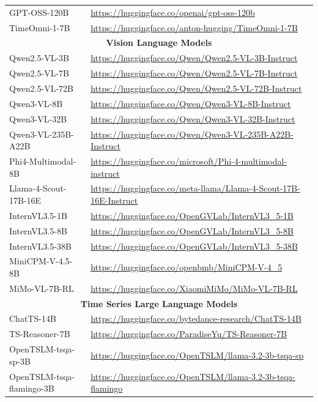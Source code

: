 \documentclass{article}
\theoremstyle{plain}
\theoremstyle{definition}
\theoremstyle{remark}
\theoremstyle{plain}
\begin{document}
\begin{table}[t]
{\begin{tabular}{ll}
GPT-OSS-120B & \url{https://huggingface.co/openai/gpt-oss-120b} \\
TimeOmni-1-7B & \url{https://huggingface.co/anton-hugging/TimeOmni-1-7B} \\
\midrule
\multicolumn{2}{c}{\textbf{Vision Language Models}} \\
\midrule 
Qwen2.5-VL-3B & \url{https://huggingface.co/Qwen/Qwen2.5-VL-3B-Instruct} \\
Qwen2.5-VL-7B & \url{https://huggingface.co/Qwen/Qwen2.5-VL-7B-Instruct} \\
Qwen2.5-VL-72B & \url{https://huggingface.co/Qwen/Qwen2.5-VL-72B-Instruct} \\
Qwen3-VL-8B & \url{https://huggingface.co/Qwen/Qwen3-VL-8B-Instruct} \\
Qwen3-VL-32B & \url{https://huggingface.co/Qwen/Qwen3-VL-32B-Instruct} \\
Qwen3-VL-235B-A22B & \url{https://huggingface.co/Qwen/Qwen3-VL-235B-A22B-Instruct} \\
Phi4-Multimodal-8B & \url{https://huggingface.co/microsoft/Phi-4-multimodal-instruct} \\
Llama-4-Scout-17B-16E & \url{https://huggingface.co/meta-llama/Llama-4-Scout-17B-16E-Instruct}\\
InternVL3.5-1B & \url{https://huggingface.co/OpenGVLab/InternVL3_5-1B} \\
InternVL3.5-8B & \url{https://huggingface.co/OpenGVLab/InternVL3_5-8B} \\
InternVL3.5-38B & \url{https://huggingface.co/OpenGVLab/InternVL3_5-38B} \\
MiniCPM-V-4.5-8B & \url{https://huggingface.co/openbmb/MiniCPM-V-4_5} \\
MiMo-VL-7B-RL & \url{https://huggingface.co/XiaomiMiMo/MiMo-VL-7B-RL}\\
\midrule
\multicolumn{2}{c}{\textbf{Time Series Large Language Models}} \\
\midrule
ChatTS-14B & \url{https://huggingface.co/bytedance-research/ChatTS-14B} \\
TS-Reasoner-7B & \url{https://huggingface.co/ParadiseYu/TS-Reasoner-7B}\\
OpenTSLM-tsqa-sp-3B & \url{https://huggingface.co/OpenTSLM/llama-3.2-3b-tsqa-sp}\\
OpenTSLM-tsqa-flamingo-3B & \url{https://huggingface.co/OpenTSLM/llama-3.2-3b-tsqa-flamingo}\\
\bottomrule
\end{tabular}
}
\end{table}
\end{document}
